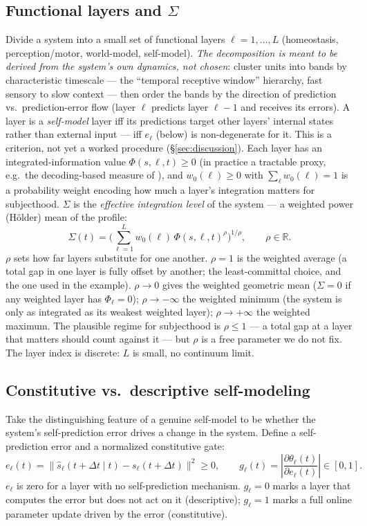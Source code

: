 \documentclass[11pt]{article}
\begin{document}
\subsection{Functional layers and $\Sigma$}
Divide a system into a small set of functional layers $\ell=1,\dots,L$ (homeostasis, perception/motor, world-model, self-model). \emph{The decomposition is meant to be derived from the system's own dynamics, not chosen}: cluster units into bands by characteristic timescale --- the ``temporal receptive window'' hierarchy, fast sensory to slow context \cite{hasson2008,kiebel2008} --- then order the bands by the direction of prediction vs.\ prediction-error flow (layer $\ell$ predicts layer $\ell-1$ and receives its errors). A layer is a \emph{self-model} layer iff its predictions target other layers' internal states rather than external input --- iff $e_\ell$ (below) is non-degenerate for it. This is a criterion, not yet a worked procedure (\S\ref{sec:discussion}). Each layer has an integrated-information value $\Phi(s,\ell,t)\ge0$ (in practice a tractable proxy, e.g.\ the decoding-based measure of \cite{oizumi2016}), and $w_0(\ell)\ge0$ with $\sum_\ell w_0(\ell)=1$ is a probability weight encoding how much a layer's integration matters for subjecthood. $\Sigma$ is the \emph{effective integration level} of the system --- a weighted power (H\"older) mean of the profile:
\[
\Sigma(t) = \Big(\textstyle\sum_{\ell=1}^{L} w_0(\ell)\,\Phi(s,\ell,t)^{\rho}\Big)^{1/\rho}, \qquad \rho\in\mathbb R.
\]
$\rho$ sets how far layers substitute for one another. $\rho=1$ is the weighted average (a total gap in one layer is fully offset by another; the least-committal choice, and the one used in the example). $\rho\to0$ gives the weighted geometric mean ($\Sigma=0$ if any weighted layer has $\Phi_\ell=0$); $\rho\to-\infty$ the weighted minimum (the system is only as integrated as its weakest weighted layer); $\rho\to+\infty$ the weighted maximum. The plausible regime for subjecthood is $\rho\le1$ --- a total gap at a layer that matters should count against it --- but $\rho$ is a free parameter we do not fix. The layer index is discrete: $L$ is small, no continuum limit.

\subsection{Constitutive vs.\ descriptive self-modeling}
Take the distinguishing feature of a genuine self-model to be whether the system's self-prediction error drives a change in the system. Define a self-prediction error and a normalized constitutive gate:
\[
e_\ell(t) = \big\|\hat s_\ell(t+\Delta t\mid t) - s_\ell(t+\Delta t)\big\|^2 \ge 0, \qquad
g_\ell(t) = \left|\frac{\partial \theta_\ell(t)}{\partial e_\ell(t)}\right| \in [0,1].
\]
$e_\ell$ is zero for a layer with no self-prediction mechanism. $g_\ell=0$ marks a layer that computes the error but does not act on it (descriptive); $g_\ell=1$ marks a full online parameter update driven by the error (constitutive).
\end{document}
